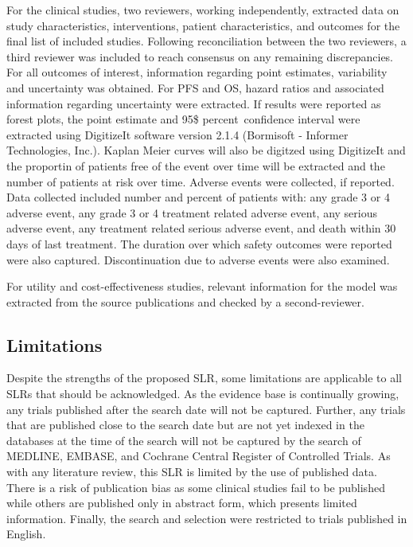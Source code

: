 \documentclass[11pt,final,fleqn]{article}\usepackage[]{graphicx}\usepackage[]{color}
\theoremstyle{plain}
\begin{document}
{\begin{appendices}
For the clinical studies, two reviewers, working independently, extracted data on study characteristics, interventions, patient characteristics, and outcomes for the final list of included studies. Following reconciliation between the two reviewers, a third reviewer was included to reach consensus on any remaining discrepancies. For all outcomes of interest, information regarding point estimates, variability and uncertainty was obtained. For PFS and OS, hazard ratios and associated information regarding uncertainty were extracted. If results were reported as forest plots, the point estimate and 95\$ percent\ confidence interval were extracted using DigitizeIt software version 2.1.4 (Bormisoft - Informer Technologies, Inc.). Kaplan Meier curves will also be digitzed using DigitizeIt and the proportin of patients free of the event over time will be extracted and the number of patients at risk over time. Adverse events were collected, if reported. Data collected included number and percent of patients with: any grade 3 or 4 adverse event, any grade 3 or 4 treatment related adverse event, any serious adverse event, any treatment related serious adverse event, and death within 30 days of last treatment. The duration over which safety outcomes were reported were also captured. Discontinuation due to adverse events were also examined. 

For utility and cost-effectiveness studies, relevant information for the model was extracted from the source publications and checked by a second-reviewer. 

\subsection{Limitations}

Despite the strengths of the proposed SLR, some limitations are applicable to all SLRs that should be acknowledged. As the evidence base is continually growing, any trials published after the search date will not be captured. Further, any trials that are published close to the search date but are not yet indexed in the databases at the time of the search will not be captured by the search of MEDLINE, EMBASE, and Cochrane Central Register of Controlled Trials. As with any literature review, this SLR is limited by the use of published data. There is a risk of publication bias as some clinical studies fail to be published while others are published only in abstract form, which presents limited information. Finally, the search and selection were restricted to trials published in English.


\end{appendices}}
\end{document}
